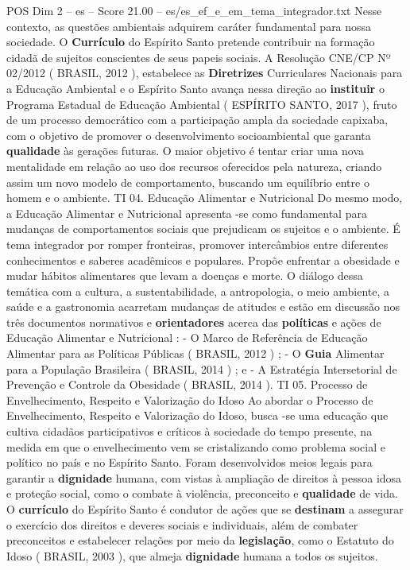 \begin{textsample}{POS Dim 2 – es – Score 21.00 – es/es\_ef\_e\_em\_tema\_integrador.txt}
Nesse contexto, as questões ambientais adquirem caráter fundamental para nossa sociedade.
O \textbf{Currículo} do Espírito Santo pretende contribuir na formação cidadã de sujeitos conscientes de seus papeis sociais.
A Resolução CNE/CP Nº 02/2012 ( BRASIL, 2012 ), estabelece as \textbf{Diretrizes} Curriculares Nacionais para a Educação Ambiental e o Espírito Santo avança nessa direção ao \textbf{instituir} o Programa Estadual de Educação Ambiental ( ESPÍRITO SANTO, 2017 ), fruto de um processo democrático com a participação ampla da sociedade capixaba, com o objetivo de promover o desenvolvimento socioambiental que garanta \textbf{qualidade} às gerações futuras.
O maior objetivo é tentar criar uma nova mentalidade em relação ao uso dos recursos oferecidos pela natureza, criando assim um novo modelo de comportamento, buscando um equilíbrio entre o homem e o ambiente.
TI 04.
Educação Alimentar e Nutricional Do mesmo modo, a Educação Alimentar e Nutricional apresenta -se como fundamental para mudanças de comportamentos sociais que prejudicam os sujeitos e o ambiente.
É tema integrador por romper fronteiras, promover intercâmbios entre diferentes conhecimentos e saberes acadêmicos e populares.
Propõe enfrentar a obesidade e mudar hábitos alimentares que levam a doenças e morte.
O diálogo dessa temática com a cultura, a sustentabilidade, a antropologia, o meio ambiente, a saúde e a gastronomia acarretam mudanças de atitudes e estão em discussão nos três documentos normativos e \textbf{orientadores} acerca das \textbf{políticas} e ações de Educação Alimentar e Nutricional : - O Marco de Referência de Educação Alimentar para as Políticas Públicas ( BRASIL, 2012 ) ; - O \textbf{Guia} Alimentar para a População Brasileira ( BRASIL, 2014 ) ; e - A Estratégia Intersetorial de Prevenção e Controle da Obesidade ( BRASIL, 2014 ).
TI 05.
Processo de Envelhecimento, Respeito e Valorização do Idoso Ao abordar o Processo de Envelhecimento, Respeito e Valorização do Idoso, busca -se uma educação que cultiva cidadãos participativos e críticos à sociedade do tempo presente, na medida em que o envelhecimento vem se cristalizando como problema social e político no país e no Espírito Santo.
Foram desenvolvidos meios legais para garantir a \textbf{dignidade} humana, com vistas à ampliação de direitos à pessoa idosa e proteção social, como o combate à violência, preconceito e \textbf{qualidade} de vida.
O \textbf{currículo} do Espírito Santo é condutor de ações que se \textbf{destinam} a assegurar o exercício dos direitos e deveres sociais e individuais, além de combater preconceitos e estabelecer relações por meio da \textbf{legislação}, como o Estatuto do Idoso ( BRASIL, 2003 ), que almeja \textbf{dignidade} humana a todos os sujeitos.

\end{textsample}
